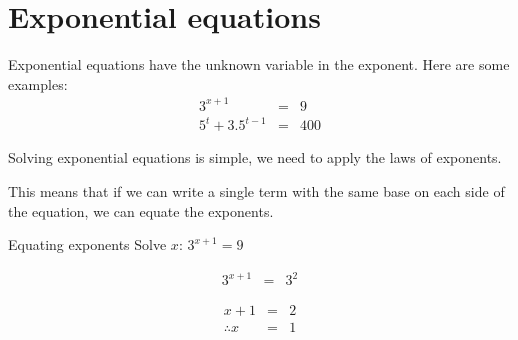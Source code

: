 \section{Exponential equations}

Exponential equations have the unknown variable in the exponent. Here are some examples:
\begin{eqnarray*}
 3^{x+1} & = & 9 \\
5^t + 3 . 5^{t-1} & = & 400
\end{eqnarray*}

Solving exponential equations is simple, we need to apply the laws of exponents.



This means that if we can write a single term with the same base on each side of the equation, we can equate the exponents.


\begin{wex}
{%
Equating exponents
}
{%
Solve $x$:
$ 3^{x+1} = 9 $
}
{%

\begin{eqnarray*}
 3^{x+1} & = & 3^2 
\end{eqnarray*}

\begin{eqnarray*}
 {x+1} & = & 2 \\
\therefore x & = & 1
\end{eqnarray*}
}
\end{wex}




